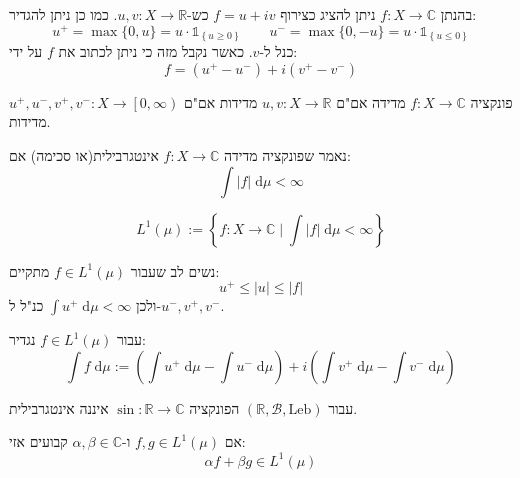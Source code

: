 \documentclass{tstextbook}
\begin{document}
\begin{proposition}
בהנתן \(f:X\to \mathbb{C}\) ניתן להציג כצירוף \(f=u+iv\) כש-\(u,v:X\to \mathbb{R}\). כמו כן ניתן להגדיר:
$$u^{+}=\max \{ 0,u \} = u \cdot \mathbb{1} _{\left\{  u\geq 0  \right\}} \qquad u^{-}=\max \{ 0,-u \} = u \cdot \mathbb{1} _{\left\{  u\leq 0  \right\}}$$
כנל ל-\(v\). כאשר נקבל מזה כי ניתן לכתוב את \(f\) על ידי:
$$f = (u^{+}-u^{-})+i(v^{+}-v^{-})$$

\end{proposition}
\begin{proposition}
פונקציה \(f:X\to \mathbb{C}\) מדידה אם"ם \(u,v:X\to \mathbb{R}\) מדידות אם"ם \(u^{+},u^{-},v^{+},v^{-}:X\to \left[ 0,\infty \right)\) מדידות.

\end{proposition}
\begin{definition}
נאמר שפונקציה מדידה \(f:X\to \mathbb{C}\) אינטגרבילית(או סכימה) אם:
$$\int \lvert f \rvert  \;\mathrm{d} \mu < \infty $$

\end{definition}
\begin{definition}
$$L^{1}\left( \mu \right):= \left\{  f:X\to \mathbb{C} \mid \int  \lvert f \rvert  \;\mathrm{d} \mu < \infty   \right\}$$

\end{definition}
\begin{remark}
נשים לב שעבור \(f \in L^{1}\left( \mu \right)\) מתקיים:
$$u^{+}\leq \lvert u \rvert \leq \lvert f \rvert $$
ולכן \(\int u^{+} \;\mathrm{d} \mu<\infty\) כנ"ל ל-\(u^{-},v^{+},v^{-}\).

\end{remark}
\begin{definition}
עבור \(f\in L^{1}\left( \mu \right)\) נגדיר:
$$\int f \;\mathrm{d} \mu := \left( \int u^{+} \;\mathrm{d} \mu -\int u^{-} \;\mathrm{d} \mu  \right)+ i\left( \int v^{+} \;\mathrm{d} \mu -\int v^{-} \;\mathrm{d} \mu  \right)$$

\end{definition}
\begin{example}
עבור \(\left( \mathbb{R}, \mathcal{B},\text{Leb} \right)\) הפונקציה \(\sin:\mathbb{R}\to \mathbb{C}\) איננה אינטגרבילית.

\end{example}
\begin{lemma}
אם \(f,g \in L^{1}\left( \mu \right)\) ו-\(\alpha,\beta \in \mathbb{C}\) קבועים אזי:
$$\alpha f+\beta g \in L^{1}\left( \mu \right)$$

\end{lemma}
\end{document}
